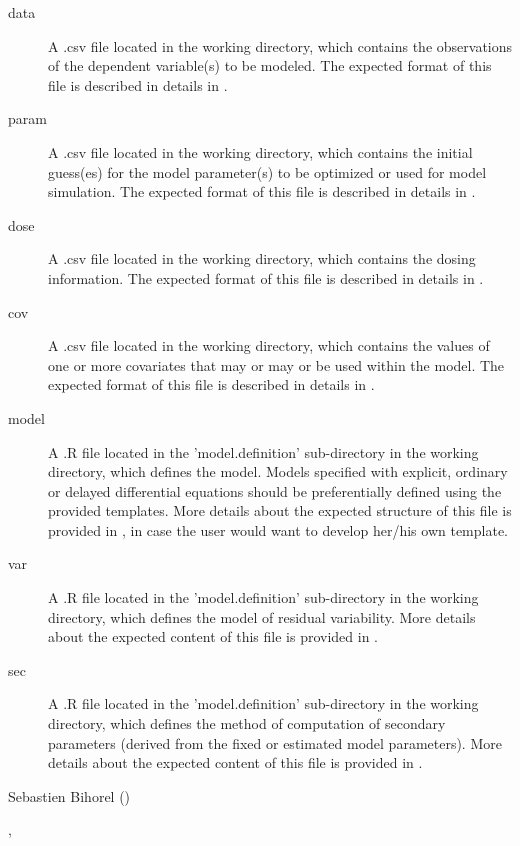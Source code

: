 \begin{Arguments}
\begin{ldescription}
\begin{description}
\item[data] A .csv file located in the working directory, which contains
the observations of the dependent variable(s) to be modeled. The
expected format of this file is described in details in
.
\item[param] A .csv file located in the working directory, which contains
the initial guess(es) for the model parameter(s) to be optimized or used
for model simulation. The expected format of this file is described in
details in .
\item[dose] A .csv file located in the working directory, which contains
the dosing information. The expected format of this file is described in
details in .
\item[cov] A .csv file located in the working directory, which contains
the values of one or more covariates that may or may or be used within
the model. The expected format of this file is described in details in
.
\item[model] A .R file located in the 'model.definition'
sub-directory in the working directory, which defines the model. Models
specified with explicit, ordinary or delayed differential equations
should be preferentially defined using the provided templates. More
details about the expected structure of this file is provided in
, in case the user would
want to develop her/his own template.
\item[var] A .R file located in the 'model.definition' sub-directory
in the working directory, which defines the model of residual
variability. More details about the expected content of this file is
provided in .
\item[sec] A .R file located in the 'model.definition' sub-directory
in the working directory, which defines the method of computation of
secondary parameters (derived from the fixed or estimated model
parameters). More details about the expected content of this file is
provided in .

\end{description}


\end{ldescription}
\end{Arguments}
%
\begin{Author}\relax
Sebastien Bihorel ()
\end{Author}
%
\begin{SeeAlso}\relax
{}, 
\end{SeeAlso}
